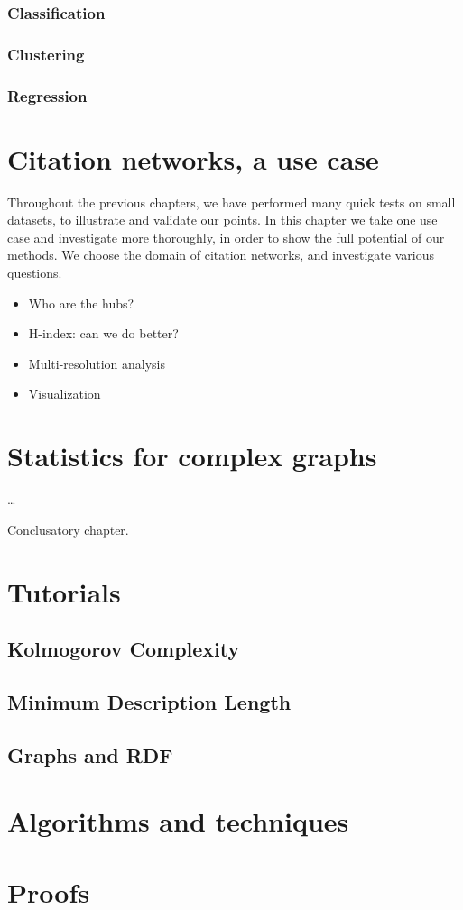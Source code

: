 \documentclass{thesis}
\begin{document}
\subsection{Classification}
\subsection{Clustering}
\subsection{Regression}

\chapter{Citation networks, a use case}

\begin{summary}Throughout the previous chapters, we have performed many quick tests on small datasets, to illustrate and validate our points. In this chapter we take one use case and investigate more thoroughly, in order to show the full potential of our methods. We choose the domain of citation networks, and investigate various questions.
\end{summary}

\begin{itemize}
  \item Who are the hubs?
  \item H-index: can we do better?
  \item Multi-resolution analysis
  \item Visualization
\end{itemize}

\chapter{Statistics for complex graphs}

\begin{summary}\ldots
\end{summary}

Conclusatory chapter.

\appendix
\chapter{Tutorials}
\section{Kolmogorov Complexity}
\section{Minimum Description Length}
\section{Graphs and RDF}
\chapter{Algorithms and techniques}
\chapter{Proofs}
\end{document}
